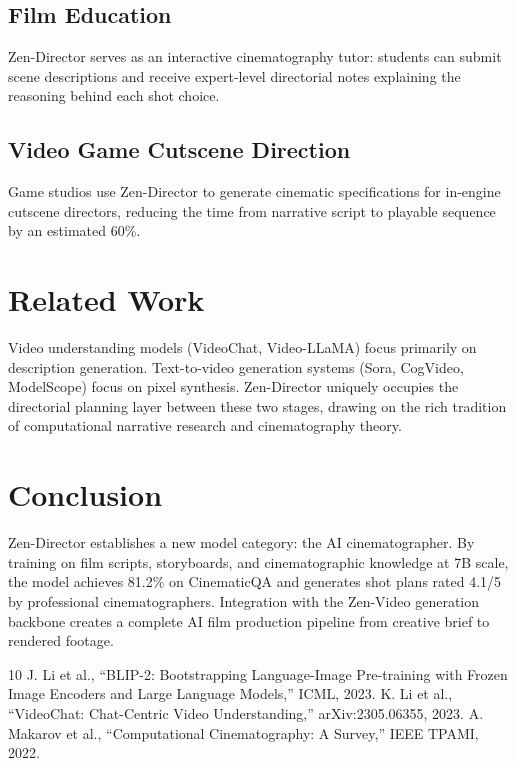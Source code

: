 \documentclass[11pt,a4paper]{article}
\begin{document}
\subsection{Film Education}

Zen-Director serves as an interactive cinematography tutor: students can submit scene
descriptions and receive expert-level directorial notes explaining the reasoning behind
each shot choice.

\subsection{Video Game Cutscene Direction}

Game studios use Zen-Director to generate cinematic specifications for in-engine cutscene
directors, reducing the time from narrative script to playable sequence by an estimated 60\%.

\section{Related Work}

Video understanding models (VideoChat, Video-LLaMA) focus primarily on description generation.
Text-to-video generation systems (Sora, CogVideo, ModelScope) focus on pixel synthesis.
Zen-Director uniquely occupies the directorial planning layer between these two stages,
drawing on the rich tradition of computational narrative research and cinematography theory.

\section{Conclusion}

Zen-Director establishes a new model category: the AI cinematographer. By training on film
scripts, storyboards, and cinematographic knowledge at 7B scale, the model achieves 81.2\%
on CinematicQA and generates shot plans rated 4.1/5 by professional cinematographers.
Integration with the Zen-Video generation backbone creates a complete AI film production
pipeline from creative brief to rendered footage.

\begin{thebibliography}{10}
 J. Li et al., ``BLIP-2: Bootstrapping Language-Image Pre-training with Frozen Image Encoders and Large Language Models,'' ICML, 2023.
 K. Li et al., ``VideoChat: Chat-Centric Video Understanding,'' arXiv:2305.06355, 2023.
 A. Makarov et al., ``Computational Cinematography: A Survey,'' IEEE TPAMI, 2022.
\end{thebibliography}
\end{document}
